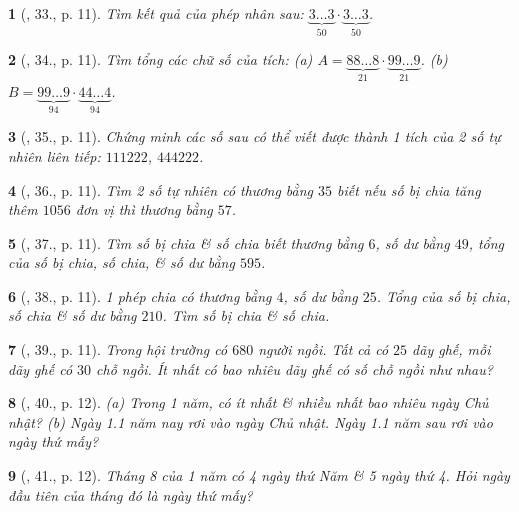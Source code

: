 \documentclass{article}
\newtheorem{baitoan}{}
\begin{document}
\begin{baitoan}[\cite{Binh_Toan_6_tap_1}, 33., p. 11]
	Tìm kết quả của phép nhân sau: $\underbrace{3\ldots 3}_{50}\cdot\underbrace{3\ldots 3}_{50}$.
\end{baitoan}

\begin{baitoan}[\cite{Binh_Toan_6_tap_1}, 34., p. 11]
	Tìm tổng các chữ số của tích: (a) $A = \underbrace{88\ldots8}_{21}\cdot\underbrace{99\ldots9}_{21}$. (b) $B = \underbrace{99\ldots9}_{94}\cdot\underbrace{44\ldots4}_{94}$.
\end{baitoan}

\begin{baitoan}[\cite{Binh_Toan_6_tap_1}, 35., p. 11]
	Chứng minh các số sau có thể viết được thành 1 tích của 2 số tự nhiên liên tiếp: $111222$, $444222$.
\end{baitoan}

\begin{baitoan}[\cite{Binh_Toan_6_tap_1}, 36., p. 11]
	Tìm 2 số tự nhiên có thương bằng $35$ biết nếu số bị chia tăng thêm $1056$ đơn vị thì thương bằng $57$.
\end{baitoan}

\begin{baitoan}[\cite{Binh_Toan_6_tap_1}, 37., p. 11]
	Tìm số bị chia \& số chia biết thương bằng $6$, số dư bằng $49$, tổng của số bị chia, số chia, \& số dư bằng $595$.
\end{baitoan}

\begin{baitoan}[\cite{Binh_Toan_6_tap_1}, 38., p. 11]
	1 phép chia có thương bằng $4$, số dư bằng $25$. Tổng của số bị chia, số chia \& số dư bằng $210$. Tìm số bị chia \& số chia.
\end{baitoan}

\begin{baitoan}[\cite{Binh_Toan_6_tap_1}, 39., p. 11]
	Trong hội trường có $680$ người ngồi. Tất cả có $25$ dãy ghế, mỗi dãy ghế có $30$ chỗ ngồi. Ít nhất có bao nhiêu dãy ghế có số chỗ ngồi như nhau?
\end{baitoan}

\begin{baitoan}[\cite{Binh_Toan_6_tap_1}, 40., p. 12]
	(a) Trong 1 năm, có ít nhất \& nhiều nhất bao nhiêu ngày Chủ nhật? (b) Ngày 1.1 năm nay rơi vào ngày Chủ nhật. Ngày 1.1 năm sau rơi vào ngày thứ mấy?
\end{baitoan}

\begin{baitoan}[\cite{Binh_Toan_6_tap_1}, 41., p. 12]
	Tháng 8 của 1 năm có 4 ngày thứ Năm \& 5 ngày thứ 4. Hỏi ngày đầu tiên của tháng đó là ngày thứ mấy?
\end{baitoan}
\end{document}
